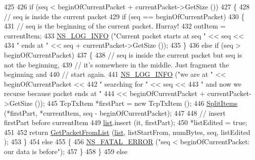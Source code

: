\begin{DoxyCode}
425 
426       \textcolor{keywordflow}{if} (seq < beginOfCurrentPacket + currentPacket->GetSize ())
427         \{
428           \textcolor{comment}{// seq is inside the current packet}
429           \textcolor{keywordflow}{if} (seq == beginOfCurrentPacket)
430             \{
431               \textcolor{comment}{// seq is the beginning of the current packet. Hurray!}
432               outItem = currentItem;
433               \hyperlink{group__logging_gafbd73ee2cf9f26b319f49086d8e860fb}{NS\_LOG\_INFO} (\textcolor{stringliteral}{"Current packet starts at seq "} << seq <<
434                            \textcolor{stringliteral}{" ends at "} << seq + currentPacket->GetSize ());
435             \}
436           \textcolor{keywordflow}{else} \textcolor{keywordflow}{if} (seq > beginOfCurrentPacket)
437             \{
438               \textcolor{comment}{// seq is inside the current packet but seq is not the beginning,}
439               \textcolor{comment}{// it's somewhere in the middle. Just fragment the beginning and}
440               \textcolor{comment}{// start again.}
441               \hyperlink{group__logging_gafbd73ee2cf9f26b319f49086d8e860fb}{NS\_LOG\_INFO} (\textcolor{stringliteral}{"we are at "} << beginOfCurrentPacket <<
442                            \textcolor{stringliteral}{" searching for "} << seq <<
443                            \textcolor{stringliteral}{" and now we recurse because packet ends at "}
444                                         << beginOfCurrentPacket + currentPacket->GetSize ());
445               TcpTxItem *firstPart = \textcolor{keyword}{new} TcpTxItem ();
446               \hyperlink{classns3_1_1TcpTxBuffer_a34d85565e5a51b10a33444ed47415f2f}{SplitItems} (*firstPart, *currentItem, seq - beginOfCurrentPacket);
447 
448               \textcolor{comment}{// insert firstPart before currentItem}
449               \hyperlink{openflow-interface_8h_afd9bcfa176617760671b67580f536fa7}{list}.insert (it, firstPart);
450               *listEdited = \textcolor{keyword}{true};
451 
452               \textcolor{keywordflow}{return} \hyperlink{classns3_1_1TcpTxBuffer_a0528a0261fe39fdb95526c24801f1091}{GetPacketFromList} (\hyperlink{openflow-interface_8h_afd9bcfa176617760671b67580f536fa7}{list}, listStartFrom, numBytes, seq, listEdited
      );
453             \}
454           \textcolor{keywordflow}{else}
455             \{
456               \hyperlink{group__fatal_ga5131d5e3f75d7d4cbfd706ac456fdc85}{NS\_FATAL\_ERROR} (\textcolor{stringliteral}{"seq < beginOfCurrentPacket: our data is before"});
457             \}
458         \}
459       \textcolor{keywordflow}{else}

\end{DoxyCode}
